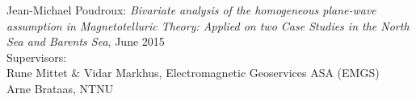 \documentclass[pdftex,10pt,b5paper,twoside]{book}
\begin{document}
%

%

\pagestyle{empty}


\vspace*{12cm}
\begin{flushleft}
Jean-Michael Poudroux:  \textit{Bivariate analysis of the homogeneous plane-wave assumption in Magnetotelluric Theory: Applied on two Case Studies in the North Sea and Barents Sea}, June 2015\\
 
 Supervisors:\\
  Rune Mittet $\&$ Vidar Markhus, Electromagnetic Geoservices  ASA (EMGS) \\
  Arne Brataas, NTNU\\ 
\end{flushleft}
\clearpage
\newpage
%
% 
% 
% 
 


 \tableofcontents 

 
 \hypersetup{linkcolor=blue} %


\pagestyle{fancy}
\renewcommand{\headrulewidth}{0.4pt}
\renewcommand{\footrulewidth}{0.4pt}
%


%
%
%



{}
\end{document}
